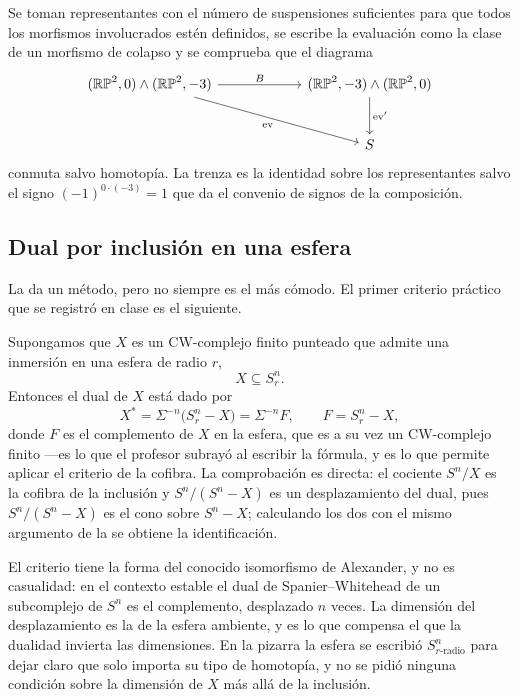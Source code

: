 \begin{sol}
Se toman representantes con el número de suspensiones suficientes para que todos los morfismos involucrados estén definidos, se escribe la evaluación como la clase de un morfismo de colapso y se comprueba que el diagrama
\[
\begin{tikzcd}[column sep=6em, row sep=large]
(\mathbb{RP}^2,0)\wedge(\mathbb{RP}^2,-3) \arrow[r,"B"] \arrow[dr,"\mathrm{ev}"'] & (\mathbb{RP}^2,-3)\wedge(\mathbb{RP}^2,0) \arrow[d,"\mathrm{ev}'"]\\
& S
\end{tikzcd}
\]
conmuta salvo homotopía. La trenza es la identidad sobre los representantes salvo el signo $(-1)^{0\cdot(-3)}=1$ que da el convenio de signos de la composición.
\end{sol}

\subsection{Dual por inclusión en una esfera}

La  da un método, pero no siempre es el más cómodo. El primer criterio práctico que se registró en clase es el siguiente.

Supongamos que $X$ es un CW-complejo finito punteado que admite una inmersión en una esfera de radio $r$,
\[
X\subseteq S^n_r .
\]
Entonces el dual de $X$ está dado por
\[
X^*=\Sigma^{-n}\bigl(S^n_r-X\bigr)=\Sigma^{-n}F,
\qquad
F=S^n_r-X ,
\]
donde $F$ es el complemento de $X$ en la esfera, que es a su vez un CW-complejo finito ---es lo que el profesor subrayó al escribir la fórmula, y es lo que permite aplicar el criterio de la cofibra. La comprobación es directa: el cociente $S^n/X$ es la cofibra de la inclusión y $S^n/(S^n-X)$ es un desplazamiento del dual, pues $S^n/(S^n-X)$ es el cono sobre $S^n-X$; calculando los dos con el mismo argumento de la  se obtiene la identificación.

\begin{nota}
   El criterio tiene la forma del conocido isomorfismo de Alexander, y no es casualidad: en el contexto estable el dual de Spanier--Whitehead de un subcomplejo de $S^n$ es el complemento, desplazado $n$ veces. La dimensión del desplazamiento es la de la esfera ambiente, y es lo que compensa el que la dualidad invierta las dimensiones. En la pizarra la esfera se escribió $S^n_{r\text{-radio}}$ para dejar claro que solo importa su tipo de homotopía, y no se pidió ninguna condición sobre la dimensión de $X$ más allá de la inclusión.
\end{nota}

